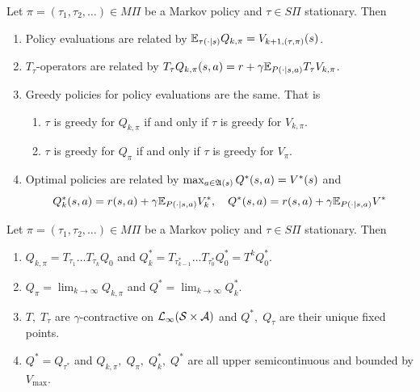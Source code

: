 \begin{prop}
  Let $\pi = (\tau_1, \tau_2, \dots) \in M\Pi$ be a Markov policy
  and $\tau \in S\Pi$ stationary. Then
  \leavevmode
  \begin{enumerate}
    \item Policy evaluations are related by
      $\mathbb{E}_{\tau(\cdot \mid s)} Q_{k, \pi} = V_{k+1, (\tau, \pi)}(s)$.
    \item $T_\tau$-operators are related by $T_\tau Q_{k, \pi}(s, a)
      = r + \gamma \mathbb{E}_{P(\cdot \mid s, a)} T_\tau V_{k, \pi}$.
    \item Greedy policies for policy evaluations are the same.
      That is
      \begin{enumerate}
	\item $\tau$ is greedy for
	  $Q_{k, \pi}$ if and only if $\tau$ is greedy for $V_{k, \pi}$.
	\item $\tau$ is greedy for $Q_\pi$ if and only if $\tau$ is greedy for
	  $V_\pi$.
      \end{enumerate}
    \item Optimal policies are related by
      $\max_{a \in \frak{A}(s)} Q^*(s, a) = V^*(s)$ and
      \[ Q^*_k(s, a) = r(s, a) + \gamma \mathbb{E}_{P(\cdot \mid s, a)} V^*_k,
      \quad Q^*(s, a) = r(s, a) + \gamma \mathbb{E}_{P(\cdot \mid s, a)} V^* \]
    \end{enumerate}
  \label{prop:relQV}
\end{prop}

\begin{prop}
  Let $\pi = (\tau_1, \tau_2, \dots) \in M\Pi$ be a Markov policy
  and $\tau \in S\Pi$ stationary. Then
  \leavevmode
  \begin{enumerate}
    \item $Q_{k, \pi} = T_{\tau_1} \dots T_{\tau_k} Q_0$ and
      $Q^*_k = T_{\tau_{k-1}^*} \dots T_{\tau_0^*} Q^*_0
      = T^k Q^*_0$.
    \item $Q_\pi = \lim_{k \to \infty} Q_{k, \pi}$ and
      $Q^* = \lim_{k\to\infty} Q_k^*$. 
    \item $T,\; T_\tau$ are $\gamma$-contractive on
      $\mathcal{L}_\infty(\mathcal{S}\times\mathcal{A})$
      and $Q^*,\; Q_\tau$ are their unique fixed points.
    \item $Q^* = Q_{\tau^*}$ and
      $Q_{k, \pi},\; Q_\pi,\; Q^*_k,\; Q^*$ are all upper semicontinuous
      and bounded by $V_{\max}$.
  \end{enumerate}
  \label{prop:propQ}
\end{prop}

